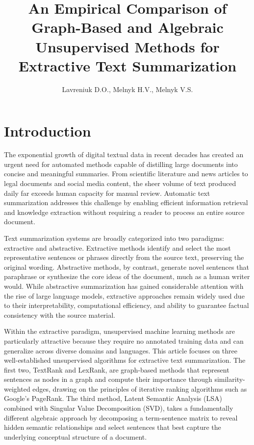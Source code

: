\documentclass[12pt,twoside,en,win]{bmzhart}
\author{Lavreniuk D.O., Melnyk H.V., Melnyk V.S.}
\title{An Empirical Comparison of Graph-Based and Algebraic Unsupervised Methods for Extractive Text Summarization}
\institute{Yuriy Fedkovych Chernivtsi National University, 2 Kotsiubynskoho Street, Chernivtsi, Ukraine}
\begin{document}
	
	
	\maketitle
	
	
	\section*{Introduction}
	
	The exponential growth of digital textual data in recent decades has created an urgent need for 
	automated methods capable of distilling large documents into concise and meaningful summaries. 
	From scientific literature and news articles to legal documents and social media content, the 
	sheer volume of text produced daily far exceeds human capacity for manual review. Automatic text 
	summarization addresses this challenge by enabling efficient information retrieval and knowledge 
	extraction without requiring a reader to process an entire source document.

	Text summarization systems are broadly categorized into two paradigms: extractive and abstractive. 
	Extractive methods identify and select the most representative sentences or phrases directly from 
	the source text, preserving the original wording. Abstractive methods, by contrast, generate novel 
	sentences that paraphrase or synthesize the core ideas of the document, much as a human writer would. 
	While abstractive summarization has gained considerable attention with the rise of large language 
	models, extractive approaches remain widely used due to their interpretability, computational 
	efficiency, and ability to guarantee factual consistency with the source material.

	Within the extractive paradigm, unsupervised machine learning methods are particularly attractive 
	because they require no annotated training data and can generalize across diverse domains and 
	languages. This article focuses on three well-established unsupervised algorithms for extractive 
	text summarization. The first two, TextRank and LexRank, are graph-based methods that represent 
	sentences as nodes in a graph and compute their importance through similarity-weighted edges, 
	drawing on the principles of iterative ranking algorithms such as Google's PageRank. The third 
	method, Latent Semantic Analysis (LSA) combined with Singular Value Decomposition (SVD), takes 
	a fundamentally different algebraic approach by decomposing a term-sentence matrix to reveal 
	hidden semantic relationships and select sentences that best capture the underlying conceptual 
	structure of a document.
\end{document}

